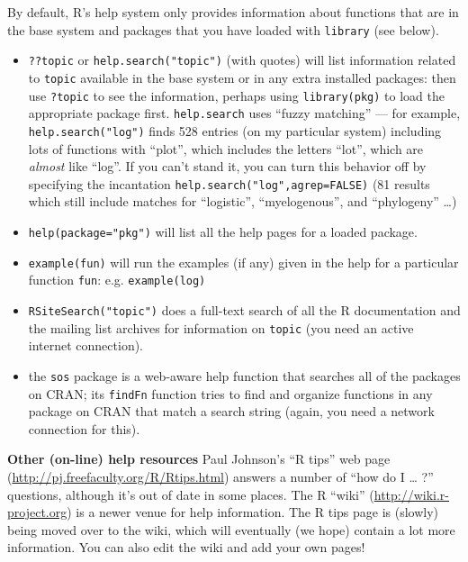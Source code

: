 \documentclass[11pt,]{article}
\begin{document}
By default, R's help system only provides information about functions
that are in the base system and packages that you have loaded with
\texttt{library} (see below).

\begin{itemize}
\item
  \texttt{??topic} or \texttt{help.search("topic")} (with quotes) will
  list information related to \texttt{topic} available in the base
  system or in any extra installed packages: then use \texttt{?topic} to
  see the information, perhaps using \texttt{library(pkg)} to load the
  appropriate package first. \texttt{help.search} uses ``fuzzy
  matching'' --- for example, \texttt{help.search("log")} finds 528
  entries (on my particular system) including lots of functions with
  ``plot'', which includes the letters ``lot'', which are \emph{almost}
  like ``log''. If you can't stand it, you can turn this behavior off by
  specifying the incantation \texttt{help.search("log",agrep=FALSE)} (81
  results which still include matches for ``logistic'', ``myelogenous'',
  and ``phylogeny'' \ldots{})
\item
  \texttt{help(package="pkg")} will list all the help pages for a loaded
  package.
\item
  \texttt{example(fun)} will run the examples (if any) given in the help
  for a particular function \texttt{fun}: e.g. \texttt{example(log)}
\item
  \texttt{RSiteSearch("topic")} does a full-text search of all the R
  documentation and the mailing list archives for information on
  \texttt{topic} (you need an active internet connection).
\item
  the \texttt{sos} package is a web-aware help function that searches
  all of the packages on CRAN; its \texttt{findFn} function tries to
  find and organize functions in any package on CRAN that match a search
  string (again, you need a network connection for this).
\end{itemize}

\textbf{Other (on-line) help resources} Paul Johnson's ``R tips'' web
page (\url{http://pj.freefaculty.org/R/Rtips.html}) answers a number of
``how do I \ldots{} ?'' questions, although it's out of date in some
places. The R ``wiki'' (\url{http://wiki.r-project.org}) is a newer
venue for help information. The R tips page is (slowly) being moved over
to the wiki, which will eventually (we hope) contain a lot more
information. You can also edit the wiki and add your own pages!
\end{document}
